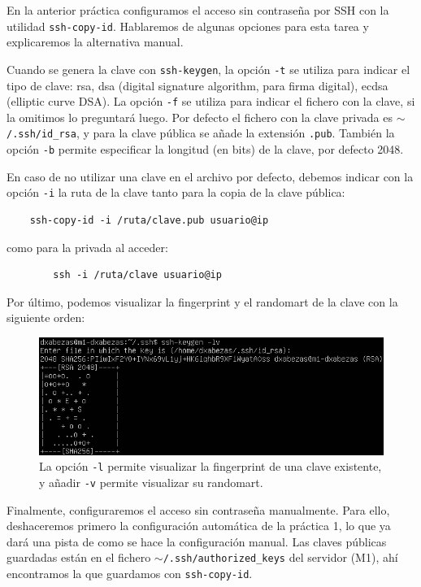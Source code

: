\documentclass{article}
\begin{document}
En la anterior práctica configuramos el acceso sin contraseña por SSH con la utilidad \texttt{ssh-copy-id}. Hablaremos de algunas opciones
para esta tarea y explicaremos la alternativa manual.

Cuando se genera la clave con \texttt{ssh-keygen}, la opción \texttt{-t} se utiliza para indicar el tipo de clave: rsa, dsa (digital
 signature algorithm, para firma digital), ecdsa (elliptic curve DSA). La opción \texttt{-f} se utiliza para indicar el fichero con la clave,
 si la omitimos lo preguntará luego. Por defecto el fichero con la clave privada es \texttt{$\mathtt{\sim}$/.ssh/id\_rsa}, y para la clave
 pública se añade la extensión \texttt{.pub}. También la opción \texttt{-b} permite especificar la longitud (en bits) de la clave, por
 defecto 2048.
 
 En caso de no utilizar una clave en el archivo por defecto, debemos indicar con la opción \texttt{-i} la ruta de la clave tanto para la
 copia de la clave pública:
 \begin{verbatim}
 	ssh-copy-id -i /ruta/clave.pub usuario@ip
 \end{verbatim}
 como para la privada al acceder:
\begin{verbatim}
		ssh -i /ruta/clave usuario@ip
\end{verbatim}

Por último, podemos visualizar la fingerprint y el randomart de la clave con la siguiente orden:

\begin{figure}[H]
	\centering
	\includegraphics[width=120mm]{imgs/ssh-fingerprint}
	\caption{La opción \texttt{-l} permite visualizar la fingerprint de una clave existente, y añadir \texttt{-v} permite visualizar
		su randomart.}
	\label{fig:ssh-fingerprint}
\end{figure}

Finalmente, configuraremos el acceso sin contraseña manualmente. Para ello, deshaceremos primero la configuración automática de la práctica 1, lo que
ya dará una pista de como se hace la configuración manual. Las claves públicas guardadas están en el fichero \texttt{$\mathtt{\sim}$/.ssh/authorized\_keys}
del servidor (M1), ahí encontramos la que guardamos con \texttt{ssh-copy-id}.
\end{document}
